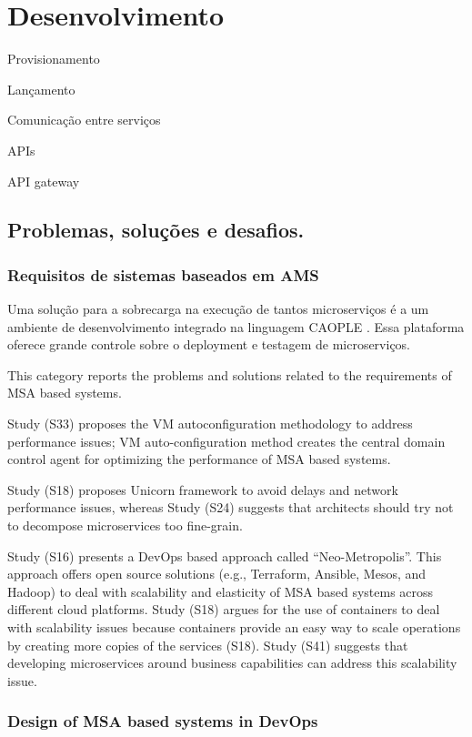 \chapter{Desenvolvimento}

Provisionamento

Lançamento

Comunicação entre serviços

APIs

API gateway

\section{Problemas, soluções e desafios.}

\subsection*{Requisitos de sistemas baseados em AMS}

Uma solução para a sobrecarga na execução de tantos microserviços é a um ambiente de desenvolvimento integrado na linguagem CAOPLE \cite{CAOPLE}. Essa plataforma oferece grande controle sobre o deployment e testagem de microserviços.


This category reports the problems and solutions related to the requirements of MSA based systems. 

Study (S33) proposes the VM autoconfiguration methodology to address performance issues; VM auto-configuration method creates the central domain control agent for optimizing the performance of MSA based systems. 

Study (S18) proposes Unicorn framework to avoid delays and network performance issues, whereas Study (S24) suggests that architects should try not to decompose microservices too fine-grain. 

Study (S16) presents a DevOps based approach called “Neo-Metropolis”. This approach offers open source solutions (e.g., Terraform, Ansible, Mesos, and Hadoop) to deal with scalability and elasticity of MSA based systems across different cloud platforms. Study (S18) argues for the use of containers to deal with scalability issues because containers provide an easy way to scale operations by creating more copies of the services (S18). Study (S41) suggests that developing microservices around business capabilities can address this scalability issue.

\subsection{Design of MSA based systems in DevOps}

